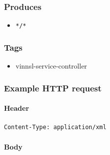 \subsubsection{Produces}\label{produces}

\begin{itemize}
\tightlist
\item
  \texttt{*/*}
\end{itemize}

\subsubsection{Tags}\label{tags}

\begin{itemize}
\tightlist
\item
  vinnsl-service-controller
\end{itemize}

\subsubsection{Example HTTP request}\label{example-http-request}

\paragraph{Header}\label{header}

\begin{verbatim}
Content-Type: application/xml
\end{verbatim}

\paragraph{Body}\label{body}

